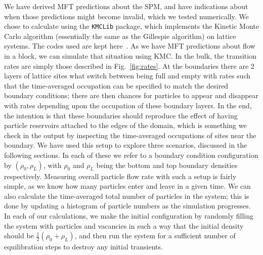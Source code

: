 We have derived MFT predictions about the SPM, and have indications about when those predictions might become invalid, which we tested numerically.
We chose to calculate using the \texttt{KMCLib}\cite{leetmaa2014kmclib} package, which implements the Kinetic Monte Carlo algorithm
(essentially the same as the Gillespie algorithm\cite{Gillespie1977})
on lattice systems. The codes used are kept here~\cite{jHellGitRepo}.
As we have MFT predictions about flow in a block, we can simulate that situation using KMC. In the bulk, the transition rates are simply those described in Fig.~\ref{fig:rates}. At the boundaries
there are 2 layers of lattice sites what switch between being full and empty with rates such that the time-averaged occupation can be specified to match the desired boundary conditions; there are then chances for particles to appear
and disappear with rates depending upon the occupation of these boundary layers. In the end, the intention is that these boundaries should reproduce the effect of having particle reservoirs attached to the edges of the domain,
which is something we check
in the output by inspecting the time-averaged occupations of sites near the boundary. We have used this setup to explore three scenarios, discussed in the following sections. In each of these we refer to a boundary condition configuration
by $(\rho_0, \rho_L)$, with $\rho_0$ and $\rho_L$ being the bottom and top boundary densities respectively.
Measuring overall particle flow rate with such a setup is fairly simple, as we know how many particles enter and leave in a given time.
We can also calculate the time-averaged total number of particles in the system; this is done by updating a histogram of particle numbers
as the simulation progresses. In each of our calculations, we make the initial configuration by randomly filling the system with particles and vacancies in such a way that the initial density should be $\frac{1}{2}(\rho_0 + \rho_L)$, and then
run the system for a sufficient number of equilibration steps to destroy any initial transients.

